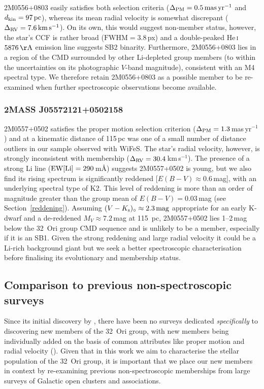 \documentclass[usenatbib]{mnras}
\newcommand{\masyr}{mas\,yr$^{-1}$}
\newcommand{\kms}{\textrm{km\,s$^{-1}$}}
\begin{document}
2M0556+0803 easily satisfies both selection criteria
($\Delta_{\rm{PM}}=0.5\,\rm{mas\,yr^{-1}}$ and
$d_{\rm{kin}}=97\,\rm{pc}$), whereas its mean radial velocity is
somewhat discrepant ($\Delta_{\rm{RV}}=7.6\,\rm{km\,s^{-1}}$). On its
own, this would suggest non-member status, however, the star's CCF is
rather broad ($\textrm{FWHM}=3.8$\,px) and a double-peaked
He\,\textsc{i} $5876\,\rm{\AA}$ emission line suggests SB2
binarity. Furthermore, 2M0556+0803 lies in a region of the CMD
surrounded by other Li-depleted group members (to within the
uncertainties on its photographic $V$-band magnitude), consistent with
an M4 spectral type.  We therefore retain 2M0556+0803 as a possible
member to be re-examined when further spectroscopic observations
become available.

\subsubsection{2MASS J05572121+0502158}
\label{2massj0557+0502}

2M0557+0502 satisfies the proper motion selection criterion
($\Delta_{\rm{PM}}=1.3$\,\masyr) and at a kinematic distance of
115\,pc was one of a small number of distance outliers in our sample
observed with WiFeS. The star's radial velocity, however, is strongly
inconsistent with membership ($\Delta_{\rm{RV}}=30.4$\,\kms). The
presence of a strong Li line ($\rm{EW[Li]}=290$\,m\AA) suggests
2M0557+0502 is young, but we also find its rising spectrum is
significantly reddened [$E(B-V)\approx0.6$\,mag], with an underlying
spectral type of K2.
This level of reddening is more than an order of magnitude greater than the
group mean of $E(B-V)=0.03$\,mag (see
Section~\ref{reddening}). Assuming 
$(V-K_{\rm{s}})_{\circ}\approx2.3\,\rm{mag}$ appropriate for an early K-dwarf and a
de-reddened $M_{V}\approx7.2$\,mag at 115~pc, 2M0557+0502 lies
1--2\,mag below the 32~Ori group CMD sequence and is unlikely to be a
member, especially if it is an SB1. Given the strong reddening and
large radial velocity it could be a Li-rich background giant but we
seek a better spectroscopic characterisation before finalising its
evolutionary and membership status.

\subsection{Comparison to previous non-spectroscopic surveys}
\label{comparison_to_previous_surveys}

Since its initial discovery by \cite{Mamajek07}, there have been no
surveys dedicated \emph{specifically} to discovering new members of
the 32~Ori group, with new members being individually added on the
basis of common attributes like proper motion and radial velocity
(\citealp{Mace09,Franciosini11}). Given that in this work we aim to
characterise the stellar population of the 32~Ori group, it is
important that we place our new members in context by re-examining
previous non-spectroscopic memberships  from large surveys
of Galactic open clusters and associations.
\end{document}
